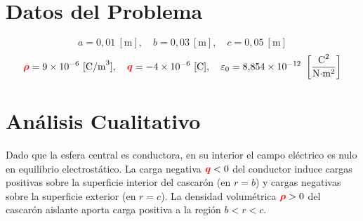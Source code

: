 \documentclass[12pt,letterpaper]{article}
\newcommand{\qr}{{\color{red}\bm{q}}}
\newcommand{\rhor}{{\color{red}\bm{\rho}}}
\begin{document}
\begin{center}
\end{center}

\section*{Datos del Problema}

\[
    a = 0{,}01\ [\text{m}], \quad
    b = 0{,}03\ [\text{m}], \quad
    c = 0{,}05\ [\text{m}]
\]
\[
    \rhor = 9\times10^{-6}\ [\text{C/m}^3], \quad
    \qr   = -4\times10^{-6}\ [\text{C}], \quad
    \varepsilon_0 = 8{,}854\times10^{-12}\ \left[\frac{\text{C}^2}{\text{N}{\cdot}\text{m}^2}\right]
\]

\section*{An\'alisis Cualitativo}

Dado que la esfera central es conductora, en su interior el campo el\'ectrico es nulo en
equilibrio electrost\'atico. La carga negativa $\qr < 0$ del conductor induce cargas positivas
sobre la superficie interior del cascar\'on (en $r = b$) y cargas negativas sobre la superficie
exterior (en $r = c$). La densidad volum\'etrica $\rhor > 0$ del cascar\'on aislante aporta
carga positiva a la regi\'on $b < r < c$.
\end{document}
